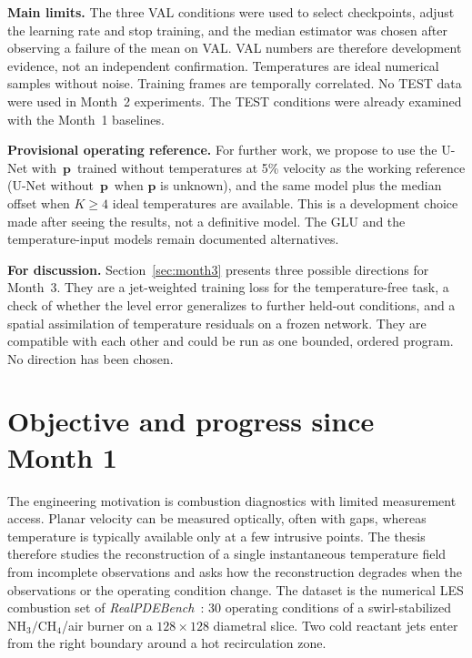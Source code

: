 \documentclass[11pt,letterpaper]{article}
\newcommand{\pon}{with~$\mathbf{p}$}
\newcommand{\poff}{without~$\mathbf{p}$}
\newcommand{\NH}{\text{NH}_3}
\begin{document}
\textbf{Main limits.} The three VAL conditions were used to select checkpoints, adjust the learning rate and stop training, and the median estimator was chosen after observing a failure of the mean on VAL. VAL numbers are therefore development evidence, not an independent confirmation. Temperatures are ideal numerical samples without noise. Training frames are temporally correlated. No TEST data were used in Month~2 experiments. The TEST conditions were already examined with the Month~1 baselines.

\textbf{Provisional operating reference.} For further work, we propose to use the U-Net \pon\ trained without temperatures at 5\% velocity as the working reference (U-Net \poff\ when $\mathbf{p}$ is unknown), and the same model plus the median offset when $K\ge4$ ideal temperatures are available. This is a development choice made after seeing the results, not a definitive model. The GLU and the temperature-input models remain documented alternatives.

\textbf{For discussion.} Section~\ref{sec:month3} presents three possible directions for Month~3. They are a jet-weighted training loss for the temperature-free task, a check of whether the level error generalizes to further held-out conditions, and a spatial assimilation of temperature residuals on a frozen network. They are compatible with each other and could be run as one bounded, ordered program. No direction has been chosen.

\section{Objective and progress since Month 1}
\label{sec:objective}

The engineering motivation is combustion diagnostics with limited measurement access. Planar velocity can be measured optically, often with gaps, whereas temperature is typically available only at a few intrusive points. The thesis therefore studies the reconstruction of a single instantaneous temperature field from incomplete observations and asks how the reconstruction degrades when the observations or the operating condition change. The dataset is the numerical LES combustion set of \textit{RealPDEBench}~\cite{hu2026realpdebench}: 30 operating conditions of a swirl-stabilized $\NH/\text{CH}_4$/air burner on a $128\times128$ diametral slice. Two cold reactant jets enter from the right boundary around a hot recirculation zone.
\end{document}
